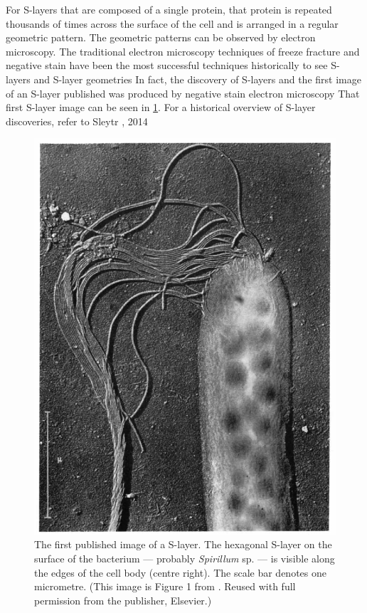 For \acp{S-layer} that are composed of a single protein, that protein is repeated thousands of times across the surface of the cell and is arranged in a regular geometric pattern.
The geometric patterns can be observed by electron microscopy. The traditional electron microscopy techniques of freeze fracture and negative stain have been the most successful
techniques historically to see \acp{S-layer} and \ac{S-layer} geometries In fact, the discovery of \acp{S-layer} and the first image of an \ac{S-layer}
published was produced by negative stain electron microscopy That first \ac{S-layer} image can be seen in \cref{fig:firstslayer}. For a historical overview
of \ac{S-layer} discoveries, refer to Sleytr \etal, 2014

\begin{figure}[p] %
  \begin{center}
    \includegraphics{intro/img/firstslayer.pdf}
  \end{center}
  \caption[The first published image of a \ac{S-layer}]{The first published image of a \ac{S-layer}. The hexagonal \ac{S-layer} on the surface of the bacterium --- probably
\textit{Spirillum} sp. --- is visible along the edges of the cell body (centre right). The scale bar denotes one micrometre. (This image is Figure 1 from .
Reused with full permission from the publisher, Elsevier.)}
  \label{fig:firstslayer}
\end{figure}


